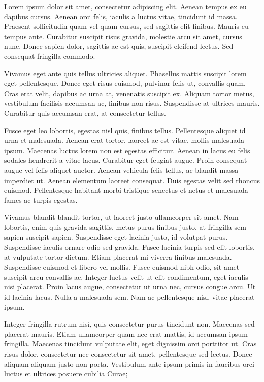 \documentclass{amsbook}
\begin{document}
Lorem ipsum dolor sit amet, consectetur adipiscing elit. Aenean tempus ex eu dapibus cursus. Aenean orci felis, iaculis a luctus vitae, tincidunt id massa. Praesent sollicitudin quam vel quam cursus, sed sagittis elit finibus. Mauris eu tempus ante. Curabitur suscipit risus gravida, molestie arcu sit amet, cursus nunc. Donec sapien dolor, sagittis ac est quis, suscipit eleifend lectus. Sed consequat fringilla commodo.

Vivamus eget ante quis tellus ultricies aliquet. Phasellus mattis suscipit lorem eget pellentesque. Donec eget risus euismod, pulvinar felis ut, convallis quam. Cras erat velit, dapibus ac urna at, venenatis suscipit ex. Aliquam tortor metus, vestibulum facilisis accumsan ac, finibus non risus. Suspendisse at ultrices mauris. Curabitur quis accumsan erat, at consectetur tellus.

Fusce eget leo lobortis, egestas nisl quis, finibus tellus. Pellentesque aliquet id urna et malesuada. Aenean erat tortor, laoreet ac est vitae, mollis malesuada ipsum. Maecenas luctus lorem non est egestas efficitur. Aenean in lacus eu felis sodales hendrerit a vitae lacus. Curabitur eget feugiat augue. Proin consequat augue vel felis aliquet auctor. Aenean vehicula felis tellus, ac blandit massa imperdiet ut. Aenean elementum laoreet consequat. Duis egestas velit sed rhoncus euismod. Pellentesque habitant morbi tristique senectus et netus et malesuada fames ac turpis egestas.

Vivamus blandit blandit tortor, ut laoreet justo ullamcorper sit amet. Nam lobortis, enim quis gravida sagittis, metus purus finibus justo, at fringilla sem sapien suscipit sapien. Suspendisse eget lacinia justo, id volutpat purus. Suspendisse iaculis ornare odio sed gravida. Fusce lacinia turpis sed elit lobortis, at vulputate tortor dictum. Etiam placerat mi viverra finibus malesuada. Suspendisse euismod et libero vel mollis. Fusce euismod nibh odio, sit amet suscipit arcu convallis ac. Integer luctus velit ut elit condimentum, eget iaculis nisi placerat. Proin lacus augue, consectetur ut urna nec, cursus congue arcu. Ut id lacinia lacus. Nulla a malesuada sem. Nam ac pellentesque nisl, vitae placerat ipsum.

Integer fringilla rutrum nisi, quis consectetur purus tincidunt non. Maecenas sed placerat mauris. Etiam ullamcorper quam nec erat mattis, id accumsan ipsum fringilla. Maecenas tincidunt vulputate elit, eget dignissim orci porttitor ut. Cras risus dolor, consectetur nec consectetur sit amet, pellentesque sed lectus. Donec aliquam aliquam justo non porta. Vestibulum ante ipsum primis in faucibus orci luctus et ultrices posuere cubilia Curae;
\end{document}
